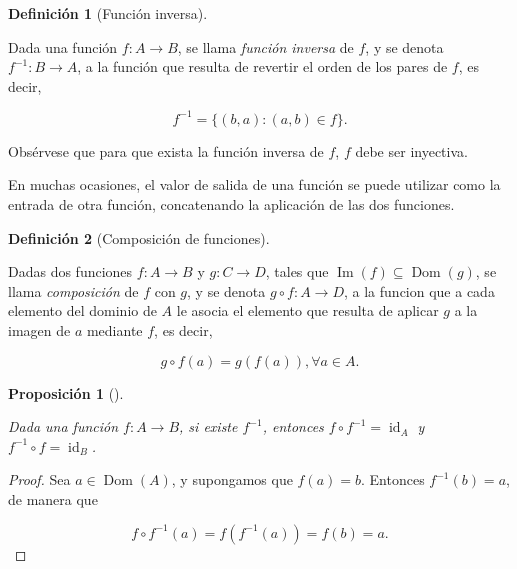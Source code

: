 \documentclass[
  a4paper,
]{scrreport}
\theoremstyle{definition}
\theoremstyle{plain}
\theoremstyle{definition}
\newtheorem{definition}{Definición}[chapter]
\theoremstyle{definition}
\theoremstyle{plain}
\theoremstyle{plain}
\newtheorem{proposition}{Proposición}[chapter]
\theoremstyle{remark}
\begin{document}
\begin{definition}[Función
inversa]\protect\hypertarget{def-funcion-inversa}{}\label{def-funcion-inversa}

Dada una función \(f:A\rightarrow B\), se llama \emph{función inversa}
de \(f\), y se denota \(f^{-1}:B\rightarrow A\), a la función que
resulta de revertir el orden de los pares de \(f\), es decir,

\[f^{-1} = \{ (b,a) : (a,b) \in f \}.\]

\end{definition}

Obsérvese que para que exista la función inversa de \(f\), \(f\) debe
ser inyectiva.

En muchas ocasiones, el valor de salida de una función se puede utilizar
como la entrada de otra función, concatenando la aplicación de las dos
funciones.

\begin{definition}[Composición de
funciones]\protect\hypertarget{def-composicion-funciones}{}\label{def-composicion-funciones}

Dadas dos funciones \(f:A\rightarrow B\) y \(g:C\rightarrow D\), tales
que \(\operatorname{Im}(f)\subseteq \operatorname{Dom}(g)\), se llama
\emph{composición} de \(f\) con \(g\), y se denota
\(g\circ f:A\rightarrow D\), a la funcion que a cada elemento del
dominio de \(A\) le asocia el elemento que resulta de aplicar \(g\) a la
imagen de \(a\) mediante \(f\), es decir,

\[g\circ f(a) = g(f(a)), \forall a\in A.\]

\end{definition}

\begin{proposition}[]\protect\hypertarget{prp-composicion-inversa}{}\label{prp-composicion-inversa}

Dada una función \(f:A\rightarrow B\), si existe \(f^{-1}\), entonces
\(f\circ f^{-1} = \operatorname{id}_A\) y
\(f^{-1}\circ f = \operatorname{id}_B\).

\end{proposition}

\begin{tcolorbox}[enhanced jigsaw, leftrule=.75mm, colbacktitle=quarto-callout-note-color!10!white, toprule=.15mm, opacityback=0, opacitybacktitle=0.6, toptitle=1mm, breakable, bottomtitle=1mm, colframe=quarto-callout-note-color-frame, rightrule=.15mm, titlerule=0mm, title=\textcolor{quarto-callout-note-color}{\faInfo}\hspace{0.5em}{Demostración}, arc=.35mm, left=2mm, bottomrule=.15mm, colback=white, coltitle=black]

\begin{proof}
Sea \(a\in\operatorname{Dom}(A)\), y supongamos que \(f(a)=b\). Entonces
\(f^{-1}(b)=a\), de manera que

\[
f\circ f^{-1}(a) 
= f(f^{-1}(a)) 
= f(b)
= a.
\]
\end{proof}

\end{tcolorbox}
\end{document}
